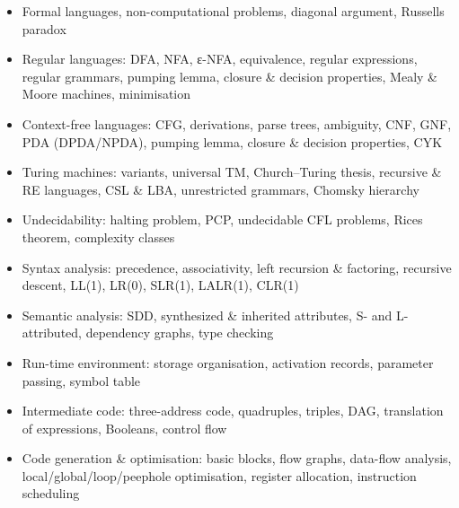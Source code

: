 

\begin{sylbox}

\begin{itemize}
\tightlist
\item[$\square$]
  Formal languages, non-computational problems, diagonal argument, Russell\textquotesingle s paradox
\item[$\square$]
  Regular languages: DFA, NFA, ε-NFA, equivalence, regular expressions, regular grammars, pumping lemma, closure \& decision properties, Mealy \& Moore machines, minimisation
\item[$\square$]
  Context-free languages: CFG, derivations, parse trees, ambiguity, CNF, GNF, PDA (DPDA/NPDA), pumping lemma, closure \& decision properties, CYK
\item[$\square$]
  Turing machines: variants, universal TM, Church--Turing thesis, recursive \& RE languages, CSL \& LBA, unrestricted grammars, Chomsky hierarchy
\item[$\square$]
  Undecidability: halting problem, PCP, undecidable CFL problems, Rice\textquotesingle s theorem, complexity classes
\item[$\square$]
  Syntax analysis: precedence, associativity, left recursion \& factoring, recursive descent, LL(1), LR(0), SLR(1), LALR(1), CLR(1)
\item[$\square$]
  Semantic analysis: SDD, synthesized \& inherited attributes, S- and L-attributed, dependency graphs, type checking
\item[$\square$]
  Run-time environment: storage organisation, activation records, parameter passing, symbol table
\item[$\square$]
  Intermediate code: three-address code, quadruples, triples, DAG, translation of expressions, Booleans, control flow
\item[$\square$]
  Code generation \& optimisation: basic blocks, flow graphs, data-flow analysis, local/global/loop/peephole optimisation, register allocation, instruction scheduling
\end{itemize}

\end{sylbox}

\needspace{131pt}

